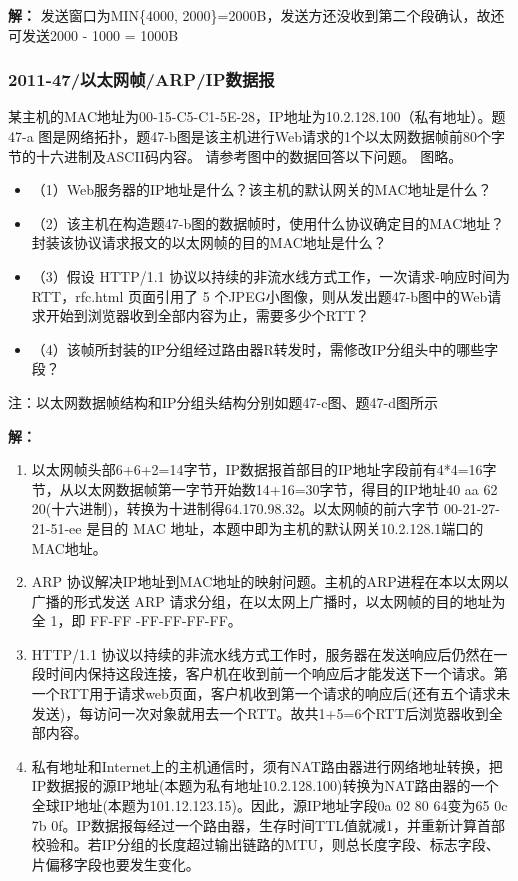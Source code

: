 \textbf{解：}
发送窗口为MIN\{4000, 2000\}=2000B，发送方还没收到第二个段确认，故还可发送2000 - 1000 = 1000B


\subsubsection{2011-47/以太网帧/ARP/IP数据报}
某主机的MAC地址为00-15-C5-C1-5E-28，IP地址为10.2.128.100（私有地址）。题47-a 图是网络拓扑，题47-b图是该主机进行Web请求的1个以太网数据帧前80个字节的十六进制及ASCII码内容。 请参考图中的数据回答以下问题。 图略。\begin{itemize}
    \item （1）Web服务器的IP地址是什么？该主机的默认网关的MAC地址是什么？ 
    \item （2）该主机在构造题47-b图的数据帧时，使用什么协议确定目的MAC地址？封装该协议请求报文的以太网帧的目的MAC地址是什么？ 
    \item （3）假设 HTTP/1.1 协议以持续的非流水线方式工作，一次请求-响应时间为 RTT，rfc.html 页面引用了 5 个JPEG小图像，则从发出题47-b图中的Web请求开始到浏览器收到全部内容为止，需要多少个RTT？ 
    \item （4）该帧所封装的IP分组经过路由器R转发时，需修改IP分组头中的哪些字段？ 
\end{itemize}
注：以太网数据帧结构和IP分组头结构分别如题47-c图、题47-d图所示

\textbf{解：}
\begin{enumerate}
    \item 以太网帧头部6+6+2=14字节，IP数据报首部目的IP地址字段前有4*4=16字节，从以太网数据帧第一字节开始数14+16=30字节，得目的IP地址40 aa 62 20(十六进制)，转换为十进制得64.170.98.32。以太网帧的前六字节 00-21-27-21-51-ee 是目的 MAC 地址，本题中即为主机的默认网关10.2.128.1端口的MAC地址。 
    \item ARP 协议解决IP地址到MAC地址的映射问题。主机的ARP进程在本以太网以广播的形式发送 ARP 请求分组，在以太网上广播时，以太网帧的目的地址为全 1，即 FF-FF -FF-FF-FF-FF。
    \item HTTP/1.1 协议以持续的非流水线方式工作时，服务器在发送响应后仍然在一段时间内保持这段连接，客户机在收到前一个响应后才能发送下一个请求。第一个RTT用于请求web页面，客户机收到第一个请求的响应后(还有五个请求未发送)，每访问一次对象就用去一个RTT。故共1+5=6个RTT后浏览器收到全部内容。
    \item 私有地址和Internet上的主机通信时，须有NAT路由器进行网络地址转换，把IP数据报的源IP地址(本题为私有地址10.2.128.100)转换为NAT路由器的一个全球IP地址(本题为101.12.123.15)。因此，源IP地址字段0a 02 80 64变为65 0c 7b 0f。IP数据报每经过一个路由器，生存时间TTL值就减1，并重新计算首部校验和。若IP分组的长度超过输出链路的MTU，则总长度字段、标志字段、片偏移字段也要发生变化。
\end{enumerate}

